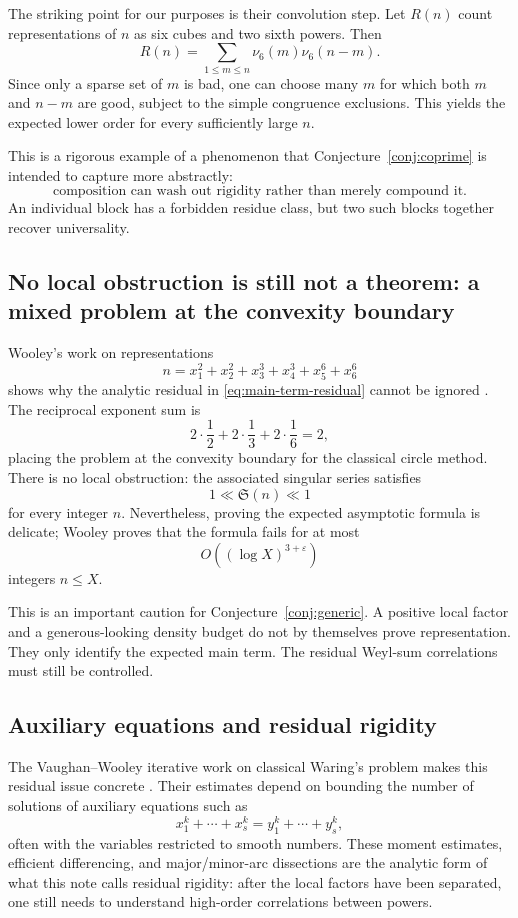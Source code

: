 \documentclass[../Axiomathic.tex]{subfiles}
\newcommand{\eps}{\varepsilon}
\begin{document}
The striking point for our purposes is their convolution step.  Let $R(n)$ count representations of $n$ as six cubes and two sixth powers.  Then
\[
  R(n)=\sum_{1\le m\le n}\nu_6(m)\nu_6(n-m).
\]
Since only a sparse set of $m$ is bad, one can choose many $m$ for which both $m$ and $n-m$ are good, subject to the simple congruence exclusions.  This yields the expected lower order for every sufficiently large $n$.

This is a rigorous example of a phenomenon that Conjecture~\ref{conj:coprime} is intended to capture more abstractly:
\[
  \boxed{\text{composition can wash out rigidity rather than merely compound it}.}
\]
An individual block has a forbidden residue class, but two such blocks together recover universality.

\subsection{No local obstruction is still not a theorem: a mixed problem at the convexity boundary}

Wooley's work on representations
\begin{equation}\label{eq:mixed-236}
  n=x_1^2+x_2^2+x_3^3+x_4^3+x_5^6+x_6^6
\end{equation}
shows why the analytic residual in \eqref{eq:main-term-residual} cannot be ignored \cite{WooleyTwoSquares}.  The reciprocal exponent sum is
\[
  2\cdot\frac12+2\cdot\frac13+2\cdot\frac16=2,
\]
placing the problem at the convexity boundary for the classical circle method.  There is no local obstruction: the associated singular series satisfies
\[
  1\ll \mathfrak S(n)\ll 1
\]
for every integer $n$.  Nevertheless, proving the expected asymptotic formula is delicate; Wooley proves that the formula fails for at most
\[
  O((\log X)^{3+\eps})
\]
integers $n\le X$.

This is an important caution for Conjecture~\ref{conj:generic}.  A positive local factor and a generous-looking density budget do not by themselves prove representation.  They only identify the expected main term.  The residual Weyl-sum correlations must still be controlled.

\subsection{Auxiliary equations and residual rigidity}

The Vaughan--Wooley iterative work on classical Waring's problem makes this residual issue concrete \cite{VaughanWooley1994}.  Their estimates depend on bounding the number of solutions of auxiliary equations such as
\[
  x_1^k+\cdots+x_s^k=y_1^k+\cdots+y_s^k,
\]
often with the variables restricted to smooth numbers.  These moment estimates, efficient differencing, and major/minor-arc dissections are the analytic form of what this note calls residual rigidity: after the local factors have been separated, one still needs to understand high-order correlations between powers.
\end{document}
